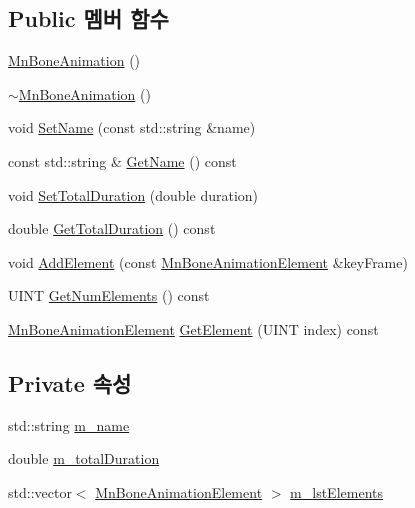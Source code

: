 \subsection*{Public 멤버 함수}
\begin{DoxyCompactItemize}
\item 
\hyperlink{class_m_n_l_1_1_mn_bone_animation_a13e19925c530a41833bef5b0bf19606a}{Mn\+Bone\+Animation} ()
\item 
\hyperlink{class_m_n_l_1_1_mn_bone_animation_a42386108606a71f25a9516620cc71bab}{$\sim$\+Mn\+Bone\+Animation} ()
\item 
void \hyperlink{class_m_n_l_1_1_mn_bone_animation_a9761262aa92163949e863423b4124cec}{Set\+Name} (const std\+::string \&name)
\item 
const std\+::string \& \hyperlink{class_m_n_l_1_1_mn_bone_animation_a4b6860d0100f2af61ecd035acbbdcd5e}{Get\+Name} () const
\item 
void \hyperlink{class_m_n_l_1_1_mn_bone_animation_a05eb549b3556fa7e355d36c0314cf024}{Set\+Total\+Duration} (double duration)
\item 
double \hyperlink{class_m_n_l_1_1_mn_bone_animation_a40f42c23266fe578394b127d34eb8208}{Get\+Total\+Duration} () const
\item 
void \hyperlink{class_m_n_l_1_1_mn_bone_animation_a77c33ae5a73412609e51eb681863e2a5}{Add\+Element} (const \hyperlink{class_m_n_l_1_1_mn_bone_animation_element}{Mn\+Bone\+Animation\+Element} \&key\+Frame)
\item 
U\+I\+NT \hyperlink{class_m_n_l_1_1_mn_bone_animation_a4ab001675acbda970c1a9b41b886d76f}{Get\+Num\+Elements} () const
\item 
\hyperlink{class_m_n_l_1_1_mn_bone_animation_element}{Mn\+Bone\+Animation\+Element} \hyperlink{class_m_n_l_1_1_mn_bone_animation_a8a40906cb4103fe6c926b439ad847e74}{Get\+Element} (U\+I\+NT index) const
\end{DoxyCompactItemize}
\subsection*{Private 속성}
\begin{DoxyCompactItemize}
\item 
std\+::string \hyperlink{class_m_n_l_1_1_mn_bone_animation_a87c5e79d5169c58db4fb0a581333eefc}{m\+\_\+name}
\item 
double \hyperlink{class_m_n_l_1_1_mn_bone_animation_a01d7e4fb6175d5492b699473df7a9650}{m\+\_\+total\+Duration}
\item 
std\+::vector$<$ \hyperlink{class_m_n_l_1_1_mn_bone_animation_element}{Mn\+Bone\+Animation\+Element} $>$ \hyperlink{class_m_n_l_1_1_mn_bone_animation_ac5e2681c430e633aec0e020f3e03354a}{m\+\_\+lst\+Elements}
\end{DoxyCompactItemize}


